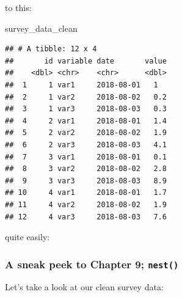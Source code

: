 \documentclass[]{gitbook}
\newenvironment{Shaded}{\begin{snugshade}}{\end{snugshade}}
\newcommand{\DataTypeTok}[1]{\textcolor[rgb]{0.13,0.29,0.53}{#1}}
\newcommand{\DecValTok}[1]{\textcolor[rgb]{0.00,0.00,0.81}{#1}}
\newcommand{\KeywordTok}[1]{\textcolor[rgb]{0.13,0.29,0.53}{\textbf{#1}}}
\newcommand{\NormalTok}[1]{#1}
\newcommand{\OperatorTok}[1]{\textcolor[rgb]{0.81,0.36,0.00}{\textbf{#1}}}
\newcommand{\OtherTok}[1]{\textcolor[rgb]{0.56,0.35,0.01}{#1}}
\newcommand{\StringTok}[1]{\textcolor[rgb]{0.31,0.60,0.02}{#1}}
\theoremstyle{definition}
\theoremstyle{definition}
\theoremstyle{definition}
\theoremstyle{remark}
\begin{document}
to this:

\begin{Shaded}
\begin{Highlighting}[]
\NormalTok{survey_data_clean}
\end{Highlighting}
\end{Shaded}

\begin{verbatim}
## # A tibble: 12 x 4
##       id variable date       value
##    <dbl> <chr>    <chr>      <dbl>
##  1     1 var1     2018-08-01   1  
##  2     1 var2     2018-08-02   0.2
##  3     1 var3     2018-08-03   0.3
##  4     2 var1     2018-08-01   1.4
##  5     2 var2     2018-08-02   1.9
##  6     2 var3     2018-08-03   4.1
##  7     3 var1     2018-08-01   0.1
##  8     3 var2     2018-08-02   2.8
##  9     3 var3     2018-08-03   8.9
## 10     4 var1     2018-08-01   1.7
## 11     4 var2     2018-08-02   1.9
## 12     4 var3     2018-08-03   7.6
\end{verbatim}

quite easily:

\begin{Shaded}
\end{Shaded}

\hypertarget{a-sneak-peek-to-chapter-9-nest}{%
\subsubsection{\texorpdfstring{A sneak peek to Chapter 9;
\texttt{nest()}}{A sneak peek to Chapter 9; nest()}}\label{a-sneak-peek-to-chapter-9-nest}}

Let's take a look at our clean survey data:
\end{document}
